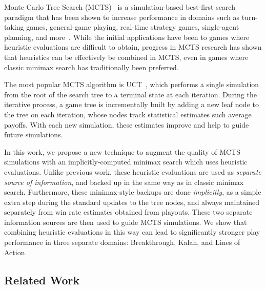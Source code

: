 \documentclass[conference]{IEEEtran}
\begin{document}
Monte Carlo Tree Search (MCTS)~\cite{Coulom06Efficient,Kocsis06Bandit} is a simulation-based best-first
search paradigm that has been shown to increase performance in domains such as turn-taking games, 
general-game playing, real-time strategy games, single-agent planning, and more~\cite{mctssurvey}. 
While the initial applications have been to games where heuristic evaluations are difficult to obtain, 
progress in MCTS research has shown that heuristics can be effectively be combined in MCTS, even in games 
where classic minimax search has traditionally been preferred. 

The most popular MCTS algorithm is UCT~\cite{Kocsis06Bandit}, 
which performs a single simulation from the root of the search tree to a terminal state at each iteration. 
During the iterative process, a game tree is incrementally built by adding a 
new leaf node to the tree on each iteration, whose nodes track statistical estimates such average payoffs. 
With each new simulation, these estimates improve and help to guide future simulations. 


In this work, we propose a new technique to augment the quality of MCTS simulations with  
an implicitly-computed minimax search which uses heuristic evaluations. 
Unlike previous work, these heuristic evaluations are used as {\it separate source of information}, 
and backed up in the same way as in classic minimax search. Furthermore, these minimax-style 
backups are done {\it implicitly},
as a simple extra step during the standard updates to the tree nodes, and always maintained 
separately from win rate estimates obtained from playouts. These two separate information 
sources are then used to guide MCTS simulations. 
We show that combining heuristic evaluations in this way can lead to significantly stronger play performance in three 
separate domains: Breakthrough, Kalah, and Lines of Action. 

\subsection{Related Work}
\end{document}
